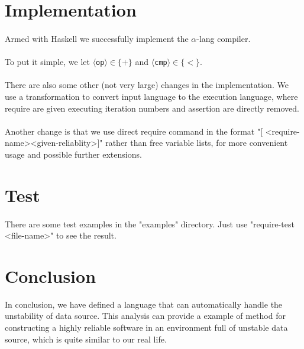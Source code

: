 \documentclass[a4paper]{article}
\begin{document}
\section{Implementation}
\paragraph{}
Armed with Haskell we successfully implement the $\alpha$-lang compiler.
\paragraph{}
To put it simple, we let $\langle$\texttt{op}$\rangle\in\{+\}$ and $\langle$\texttt{cmp}$\rangle\in\{<\}$.
\paragraph{}
There are also some other (not very large) changes in the implementation. We use a transformation to convert input language to the execution language, where require are given executing iteration numbers and assertion are directly removed.
\paragraph{}
Another change is that we use direct require command in the format "[ \textless require-name\textgreater  \textless given-reliablity\textgreater ]" rather than free variable lists, for more convenient usage and possible further extensions.
\section{Test}
\paragraph{}
There are some test examples in the "examples" directory. Just use "require-test \textless file-name\textgreater" to see the result.
\section{Conclusion}
In conclusion, we have defined a language that can automatically handle the unstability of data source. This analysis can provide a example of method for constructing a highly reliable software in an environment full of unstable data source, which is quite similar to our real life.
\paragraph{}
\end{document}
